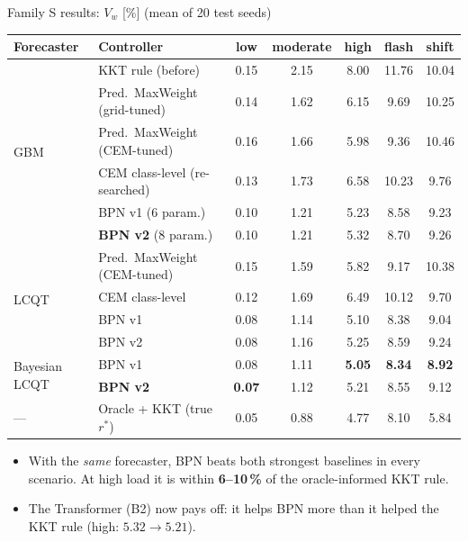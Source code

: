 \documentclass[aspectratio=169,11pt,xcolor=table]{beamer}
\newcommand{\rstar}{r^{\ast}}
\newcommand{\best}[1]{\textbf{\textcolor{good}{#1}}}
\begin{document}
\begin{frame}{Family S results: $V_w$ [\%] (mean of 20 test seeds)}
  \scriptsize
  \centering
  \begin{tabular}{llccccc}
    \toprule
    Forecaster & Controller & low & moderate & high & flash & shift \\
    \midrule
    \multirow{6}{*}{GBM} & KKT rule (before) & 0.15 & 2.15 & 8.00 & 11.76 & 10.04 \\
    & Pred.\ MaxWeight (grid-tuned) & 0.14 & 1.62 & 6.15 & 9.69 & 10.25 \\
    & Pred.\ MaxWeight (CEM-tuned) & 0.16 & 1.66 & 5.98 & 9.36 & 10.46 \\
    & CEM class-level (re-searched) & 0.13 & 1.73 & 6.58 & 10.23 & 9.76 \\
    & BPN v1 (6 param.) & 0.10 & 1.21 & 5.23 & 8.58 & 9.23 \\
    & \textbf{BPN v2} (8 param.) & 0.10 & 1.21 & 5.32 & 8.70 & 9.26 \\
    \midrule
    \multirow{4}{*}{LCQT} & Pred.\ MaxWeight (CEM-tuned) & 0.15 & 1.59 & 5.82 & 9.17 & 10.38 \\
    & CEM class-level & 0.12 & 1.69 & 6.49 & 10.12 & 9.70 \\
    & BPN v1 & 0.08 & 1.14 & 5.10 & 8.38 & 9.04 \\
    & BPN v2 & 0.08 & 1.16 & 5.25 & 8.59 & 9.24 \\
    \midrule
    \multirow{2}{*}{Bayesian LCQT} & BPN v1 & 0.08 & 1.11 & \best{5.05} & \best{8.34} & \best{8.92} \\
    & \cellcolor{good!10}\textbf{BPN v2} & \cellcolor{good!10}\best{0.07} & \cellcolor{good!10}1.12 & \cellcolor{good!10}5.21 & \cellcolor{good!10}8.55 & \cellcolor{good!10}9.12 \\
    \midrule
    --- & Oracle + KKT (true $\rstar$) & 0.05 & 0.88 & 4.77 & 8.10 & 5.84 \\
    \bottomrule
  \end{tabular}
  \normalsize
  \begin{itemize}\footnotesize
    \item With the \emph{same} forecaster, BPN beats both strongest baselines in every scenario. At high load it is within \textbf{6--10\,\%} of the oracle-informed KKT rule.
    \item The Transformer (B2) now pays off: it helps BPN more than it helped the KKT rule (high: $5.32 \to 5.21$).
  \end{itemize}
\end{frame}
\end{document}
